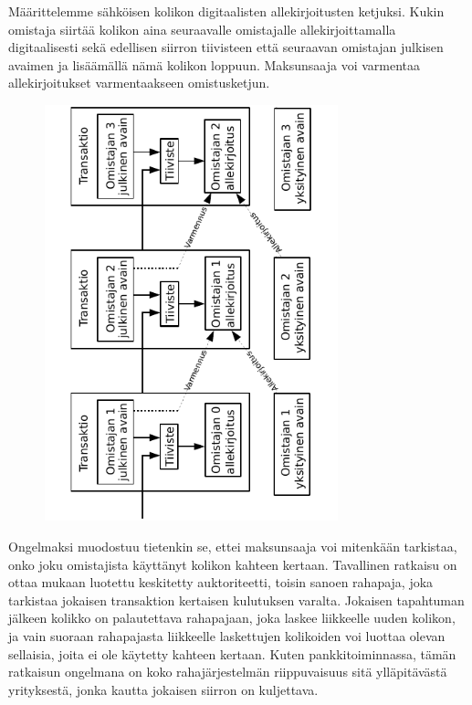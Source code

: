 \documentclass{article}
\begin{document}
Määrittelemme sähköisen kolikon digitaalisten allekirjoitusten ketjuksi. Kukin omistaja siirtää kolikon aina seuraavalle omistajalle allekirjoittamalla digitaalisesti sekä edellisen siirron tiivisteen että seuraavan omistajan julkisen avaimen ja lisäämällä nämä kolikon loppuun. Maksunsaaja voi varmentaa allekirjoitukset varmentaakseen omistusketjun.

\begin{figure}[H]
    \centering
    \includegraphics[angle=270,width=8.5cm]{figures/fig1.pdf}
\end{figure}

Ongelmaksi muodostuu tietenkin se, ettei maksunsaaja voi mitenkään tarkistaa, onko joku omistajista käyttänyt kolikon kahteen kertaan. Tavallinen ratkaisu on ottaa mukaan luotettu keskitetty auktoriteetti, toisin sanoen rahapaja, joka tarkistaa jokaisen transaktion kertaisen kulutuksen varalta. Jokaisen tapahtuman jälkeen kolikko on palautettava rahapajaan, joka laskee liikkeelle uuden kolikon, ja vain suoraan rahapajasta liikkeelle laskettujen kolikoiden voi luottaa olevan sellaisia, joita ei ole käytetty kahteen kertaan. Kuten pankkitoiminnassa, tämän ratkaisun ongelmana on koko rahajärjestelmän riippuvaisuus sitä ylläpitävästä yrityksestä, jonka kautta jokaisen siirron on kuljettava.
\end{document}
